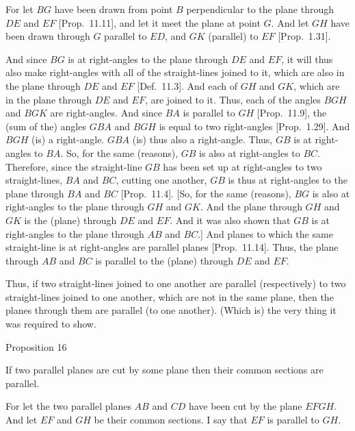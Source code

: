 For let $BG$ have been drawn from point $B$ perpendicular to the
plane through $DE$ and $EF$ [Prop.~11.11], and
let it meet the plane at point $G$. And let $GH$ have been drawn through
$G$ parallel to $ED$, and $GK$ (parallel) to $EF$ [Prop.~1.31].

\epsfysize=2.2in
\centerline{}

And since $BG$ is at right-angles to the plane through $DE$ and $EF$,
it will thus also make right-angles with all of the straight-lines joined to it, which
are also in the plane through $DE$ and $EF$ [Def.~11.3]. And each of $GH$ and
$GK$, which are in the plane through $DE$ and $EF$,  are joined to it. 
Thus, each of the angles $BGH$ and $BGK$ are right-angles. And since
$BA$ is parallel to $GH$ [Prop.~11.9], the (sum of the) angles $GBA$ and $BGH$
is equal to two right-angles [Prop.~1.29]. 
And $BGH$ (is) a right-angle. $GBA$ (is) thus also a right-angle.
Thus, $GB$ is at right-angles to $BA$. So, for the same (reasons), $GB$
is also at right-angles to $BC$. Therefore, since the straight-line $GB$
has been set up at right-angles to two straight-lines, $BA$ and $BC$, cutting
one another, $GB$ is thus at right-angles to the plane through $BA$ and
$BC$ [Prop.~11.4]. [So, for the same (reasons), $BG$ is also at right-angles to the plane through $GH$ and $GK$. And the plane
through $GH$ and $GK$ is the (plane) through $DE$ and $EF$. And it was also shown that $GB$ is at right-angles to the plane through $AB$ and
$BC$.] And planes to which the same straight-line is at right-angles are
parallel planes [Prop.~11.14]. Thus, the plane
through $AB$ and $BC$ is parallel to the (plane) through $DE$ and $EF$.

Thus, if two straight-lines joined to one another
are parallel (respectively) to two straight-lines joined to one another, which
are not in the same plane,
then the planes through them are parallel (to one another). (Which is) the very thing it was required to show.


\begin{center}
{\large Proposition 16}
\end{center}

If two parallel planes are cut by some plane
then their common sections are parallel.

For let the two parallel planes $AB$ and $CD$ have been cut by the
plane $EFGH$. And let $EF$ and $GH$ be their common sections.
I say that $EF$ is parallel to $GH$.\\

